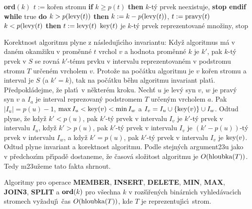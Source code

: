 {\bf ord$(k)$ \newline 
$t:=$}ko\v ren stromu \newline 
{\bf if} $k\ge p(t)$ {\bf then} $k$-t\'y prvek neexistuje, {\bf stop endif\newline 
while} true {\bf do}\newline 
\phantom{---}{\bf if} $k>p(\operatorname{levy}(t))$ {\bf then}\newline 
\phantom{------}$k:=k-p(\operatorname{levy}(t))$, $t:=\operatorname{pravy}(t)$\newline 
\phantom{---}{\bf else}\newline 
\phantom{------}{\bf if} $k<p(\operatorname{levy}(t)$ {\bf then}\newline 
\phantom{---------}$t:=\operatorname{levy}(t)$\newline 
\phantom{------}{\bf else}\newline 
\phantom{---------}$\operatorname{key}(t)$ je $k$-t\'y prvek reprezentovan\'e mno\v ziny, stop \newline 
\phantom{------}{\bf endif}\newline 
\phantom{---}{\bf endif\newline 
enddo}
\bigskip

\flushpar Korektnost algoritmu plyne z n\'asleduj\'\i c\'\i ho invariantu:  
Kdy\v z algoritmus m\'a v dan\'em okam\v ziku v prom\v enn\'e $t$ vrchol $
v$ 
a hodnota prom\v enn\'e $k$ je $k'$, pak $k$-t\'y prvek v $S$ se rovn\'a 
$k'$-t\'emu prvku v intervalu reprezentovan\'em v podstromu 
stromu $T$ ur\v cen\'em vrcholem $v$.  Proto\v ze na po\v c\'atku algoritmu 
je $v$ ko\v ren stromu a interval je $S$ (a $k'=k$), tak na po\v c\'atku 
b\v ehu algoritmu invariant plat\'\i.  P\v redpokl\'adejme, \v ze plat\'\i\ v 
n\v ekter\'em kroku.  Nech\v t $u$ je lev\'y syn $v$, $w$ je prav\'y syn $
v$ a 
$I_a$ je interval reprezovan\'y podstromem $T$ ur\v cen\'ym vrcholem $
a$.  
Pak $|I_u|=p(u)-1$, $\max I_u<\operatorname{key}(v)<\min I_w$ a 
$I_v=I_u\cup \{\operatorname{key}(v)\}\cup I_w$.  Odtud plyne, \v ze kdy\v z $k'
<p(u)$, pak 
$k'$-t\'y prvek v intervalu $I_v$ je $k'$-t\'y prvek v intervalu $
I_u$, kdy\v z 
$k'>p(u)$, pak $k'$-t\'y prvek v intervalu $I_v$ je $(k'-p(u))$-t\'y prvek 
v intervalu $I_w$, a kdy\v z $k'=p(u)$, pak $k'$-t\'y prvek v intervalu $
I_v$ 
je $\operatorname{key}(v)$.  Odtud plyne invariant a korektnost algoritmu.  
Podle stejn\'ych argument\accent23u jako v p\v redchoz\'\i m p\v r\'\i pad\v e 
dostaneme, \v ze \v casov\'a slo\v zitost algoritmu je $O(\operatorname{hloubka}
(T))$.  
Tedy m\accent23u\v zeme tato fakta shrnout.  

Algoritmy pro operace {\bf MEMBER}, {\bf INSERT}, {\bf DE\-LE\-TE}, {\bf MIN}, {\bf MAX}, 
{\bf JOIN3}, {\bf SPLIT} a $\bold o\bold r\bold d(k)$ pro v\v sechna $
k$ v roz\v s\'\i\v ren\'ych bin\'ar\-n\'\i ch 
vy\-hled\'avac\'\i ch stromech vy\v zaduj\'\i\ \v cas $O(\operatorname{hloubka}
(T))$, kde $T$ je 
reprezentuj\'\i c\'\i\ strom. 
\endproclaim


